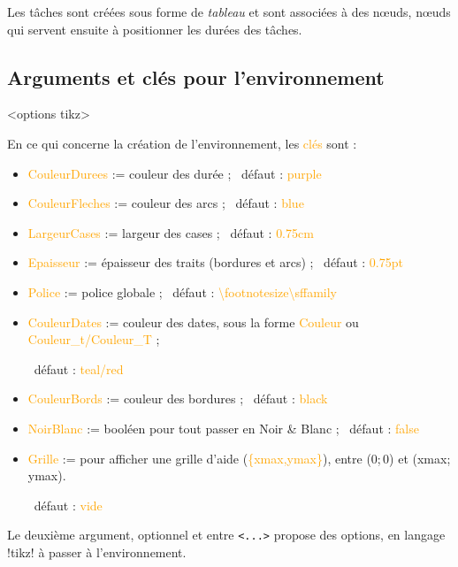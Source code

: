 \documentclass[french,a4paper,11pt]{article}
\newcommand\Cle[1]{{\small\sffamily\textlangle \textcolor{orange}{#1}\textrangle}}
\begin{document}
\begin{tipblock}
Les tâches sont créées sous forme de \textit{tableau} et sont associées à des nœuds, nœuds qui servent ensuite à positionner les durées des tâches.
\end{tipblock}

\pagebreak

\subsection{Arguments et clés pour l'environnement}

\begin{DemoCode}
\begin{GrapheMPM}[clés]<options tikz>
\end{GrapheMPM}
\end{DemoCode}

\begin{tipblock}
En ce qui concerne la création de l'environnement, les \Cle{clés} sont :

\begin{itemize}
	\item \Cle{CouleurDurees} := couleur des durée ; \hfill~défaut : \Cle{purple}
	\item \Cle{CouleurFleches} := couleur des arcs ; \hfill~défaut : \Cle{blue}
	\item \Cle{LargeurCases} := largeur des cases ; \hfill~défaut : \Cle{0.75cm}
	\item \Cle{Epaisseur} := épaisseur des traits (bordures et arcs) ; \hfill~défaut : \Cle{0.75pt}
	\item \Cle{Police} := police globale ; \hfill~défaut : \Cle{\textbackslash footnotesize\textbackslash sffamily}
	\item \Cle{CouleurDates} := couleur des dates, sous la forme \Cle{Couleur} ou \Cle{Couleur\_t/Couleur\_T} ;
	
	\hfill~défaut : \Cle{teal/red}
	\item \Cle{CouleurBords} := couleur des bordures ; \hfill~défaut : \Cle{black}
	\item \Cle{NoirBlanc} := booléen pour tout passer en Noir \&{} Blanc ; \hfill~défaut : \Cle{false}
	\item \Cle{Grille} := pour afficher une grille d'aide (\Cle{\{xmax,ymax\}}), entre (0;\,0) et (xmax;\,ymax).
	
	\hfill~défaut : \Cle{vide}
\end{itemize}

Le deuxième argument, optionnel et entre \texttt{<...>} propose des options, en langage \packagetex!tikz! à passer à l'environnement.
\end{tipblock}
\end{document}
